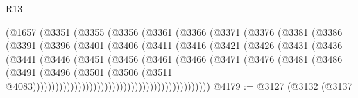 \begin{lexlean}{R13}
\begin{coremodule}
                            (@1657
                              (@3351
                                (@3355
                                  (@3356
                                    (@3361
                                      (@3366
                                        (@3371
                                          (@3376
                                            (@3381
                                              (@3386
                                                (@3391
                                                  (@3396
                                                    (@3401
                                                      (@3406
                                                        (@3411
                                                          (@3416
                                                            (@3421
                                                              (@3426
                                                                (@3431
                                                                  (@3436
                                                                    (@3441
                                                                      (@3446
                                                                        (@3451
                                                                          (@3456
                                                                            (@3461
                                                                              (@3466
                                                                                (@3471
                                                                                  (@3476
                                                                                    (@3481
                                                                                      (@3486
                                                                                        (@3491
                                                                                          (@3496
                                                                                            (@3501
                                                                                              (@3506
                                                                                                (@3511
                                                                                                  @4083)))))))))))))))))))))))))))))))))))))))))))))))
@4179 := @3127
    (@3132
      (@3137

\end{coremodule}
\end{lexlean}
